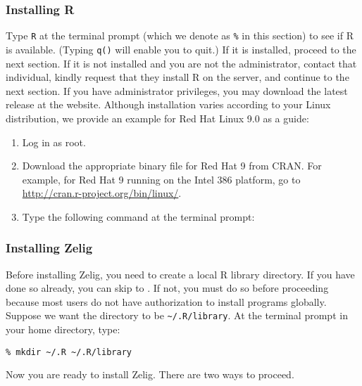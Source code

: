 \subsubsection{Installing R}
Type {\tt R} at the terminal prompt (which we denote as {\tt \%} in
this section) to see if R is available. (Typing \texttt{q()} will
enable you to quit.)  If it is installed, proceed to the next section.
If it is not installed and you are not the administrator, contact that
individual, kindly request that they install R on the server, and
continue to the next section. If you have administrator privileges,
you may download the latest release at the
 website.  Although
installation varies according to your Linux distribution, we provide
an example for Red Hat Linux 9.0 as a guide:

\begin{enumerate}

\item Log in as root.

\item Download the appropriate binary file for Red Hat 9 from CRAN.
  For example, for Red Hat 9 running on the Intel 386 platform, go to
  \url{http://cran.r-project.org/bin/linux/}. 

\item Type the following command at the terminal prompt:

\end{enumerate}

\subsubsection{Installing Zelig}\label{sss:unix.library}

Before installing Zelig, you need to create a local R library
directory. If you have done so already, you can skip to
. If not, you must do so before proceeding because
most users do not have authorization to install programs globally.
Suppose we want the directory to be {\tt \~{}/.R/library}.  At the
terminal prompt in your home directory, type:
\begin{verbatim}
% mkdir ~/.R ~/.R/library
\end{verbatim}
Now you are ready to install Zelig.\label{unix.zelig} There are two
ways to proceed.

